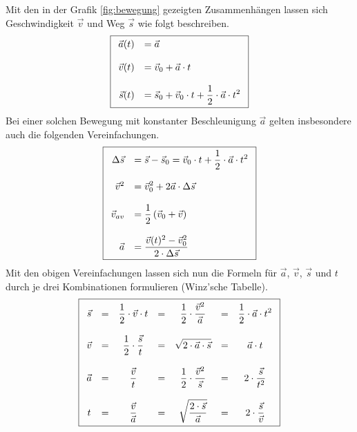 \noindent
Mit den in der Grafik \ref{fig:bewegung} gezeigten Zusammenhängen lassen
sich Geschwindigkeit $\vec{v}$ und Weg $\vec{s}$ wie folgt beschreiben.
\[ \boxed{\begin{array}{r l} 
	\vec{a}(t) 	&= \displaystyle
		\vec{a} \\
	& \\
	\vec{v}(t)	&= \displaystyle 
		\vec{v}_0+\vec{a}\cdot t \\
	& \\
	\vec{s}(t) 	&= \displaystyle 
		\vec{s}_0+\vec{v}_0\cdot t+\frac{1}{2}\cdot\vec{a}\cdot t^2
\end{array}}\]
Bei einer solchen Bewegung mit konstanter Beschleunigung $\vec{a}$ gelten
insbesondere auch die folgenden Vereinfachungen.
\[ \boxed{\begin{array}{r l}
	\Delta \vec{s}	&= \displaystyle
		\vec{s}-\vec{s}_0 = \displaystyle
		\vec{v}_0\cdot t+\frac{1}{2}\cdot \vec{a}\cdot t^2 \\
	& \\
	\vec{v}^2 	&= \displaystyle
		\vec{v}_{0}^{2}+2\vec{a} \cdot \Delta \vec{s} \\
	& \\
	\vec{v}_{av} &= \displaystyle
		\frac{1}{2} \left( \vec{v}_0 + \vec{v} \right) \\
	& \\
	\vec{a} 	&= \displaystyle
		\frac{\vec{v}(t)^2-\vec{v}_0^2}{2\cdot\Delta \vec{s}} 
\end{array}}\]
Mit den obigen Vereinfachungen lassen sich nun die Formeln für 
$\vec{a}$, $\vec{v}$, $\vec{s}$ und $t$ durch je drei
Kombinationen formulieren (Winz'sche Tabelle).
\[ \boxed{\begin{array}{c c c c c c c}
	\vec{s}	
		&=& \displaystyle 
			\frac{1}{2} \cdot \vec{v} \cdot t
		&=& \displaystyle 
			\frac{1}{2} \cdot \frac{\vec{v}^2}{\vec{a}}
		&=& \displaystyle 
			\frac{1}{2} \cdot \vec{a} \cdot t^2 \\
	& & & & & & \\
	\vec{v} 
		&=& \displaystyle 
			\frac{1}{2} \cdot \frac{\vec{s}}{t}
		&=& \displaystyle 
			\sqrt{2 \cdot \vec{a} \cdot \vec{s}}
		&=& \displaystyle 
			\vec{a} \cdot t \\
	& & & & & & \\
	\vec{a}
		&=& \displaystyle 
			\frac{\vec{v}}{t} 
		&=& \displaystyle 
			\frac{1}{2} \cdot \frac{\vec{v}^2}{\vec{s}}
		&=& \displaystyle 
			2 \cdot \frac{\vec{s}}{t^2} \\
	& & & & & & \\
	t 	
		&=& \displaystyle 
			\frac{\vec{v}}{\vec{a}}
		&=& \displaystyle 
			\sqrt{\frac{2 \cdot \vec{s}}{\vec{a}}}
		&=& \displaystyle 
			2 \cdot \frac{\vec{s}}{\vec{v}}
\end{array}}\]

